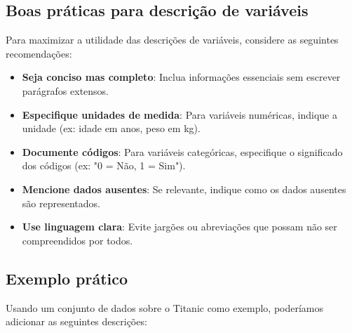 
\subsection{Boas práticas para descrição de variáveis}

Para maximizar a utilidade das descrições de variáveis, considere as seguintes recomendações:

\begin{itemize}
    \item \textbf{Seja conciso mas completo}: Inclua informações essenciais sem escrever parágrafos extensos.
    \item \textbf{Especifique unidades de medida}: Para variáveis numéricas, indique a unidade (ex: idade em anos, peso em kg).
    \item \textbf{Documente códigos}: Para variáveis categóricas, especifique o significado dos códigos (ex: "0 = Não, 1 = Sim").
    \item \textbf{Mencione dados ausentes}: Se relevante, indique como os dados ausentes são representados.
    \item \textbf{Use linguagem clara}: Evite jargões ou abreviações que possam não ser compreendidos por todos.
\end{itemize}

\subsection{Exemplo prático}

Usando um conjunto de dados sobre o Titanic como exemplo, poderíamos adicionar as seguintes descrições:


